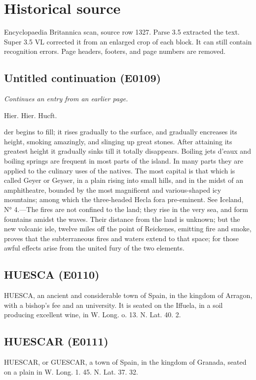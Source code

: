 \documentclass{article}
\begin{document}
\section*{Historical source}
Encyclopaedia Britannica scan, source row 1327. Parse 3.5 extracted the text. Super 3.5 VL corrected it from an enlarged crop of each block. It can still contain recognition errors.
Page headers, footers, and page numbers are removed.

\subsection*{Untitled continuation (E0109)}
\textit{Continues an entry from an earlier page.}

Hier.
Hier.
Hucft.

der begins to fill; it rises gradually to the surface, and gradually encreases its height, smoking amazingly, and slinging up great stones. After attaining its greatest height it gradually sinks till it totally disappears. Boiling jets d'eaux and boiling springs are frequent in most parts of the island. In many parts they are applied to the culinary uses of the natives. The most capital is that which is called Geyer or Geyser, in a plain rising into small hills, and in the midst of an amphitheatre, bounded by the most magnificent and various-shaped icy mountains; among which the three-headed Hecla fora pre-eminent. See Iceland, N° 4.—The fires are not confined to the land; they rise in the very sea, and form fountains amidst the waves. Their distance from the land is unknown; but the new volcanic isle, twelve miles off the point of Reickenes, emitting fire and smoke, proves that the subterraneous fires and waters extend to that space; for those awful effects arise from the united fury of the two elements.

\subsection*{HUESCA (E0110)}
HUESCA, an ancient and considerable town of
Spain, in the kingdom of Arragon, with a bishop's
fee and an university. It is seated on the Iffuela, in
a soil producing excellent wine, in W. Long. o. 13.
N. Lat. 40. 2.

\subsection*{HUESCAR (E0111)}
HUESCAR, or GUESCAR, a town of Spain, in the
kingdom of Granada, seated on a plain in W. Long.
1. 45. N. Lat. 37. 32.
\end{document}
